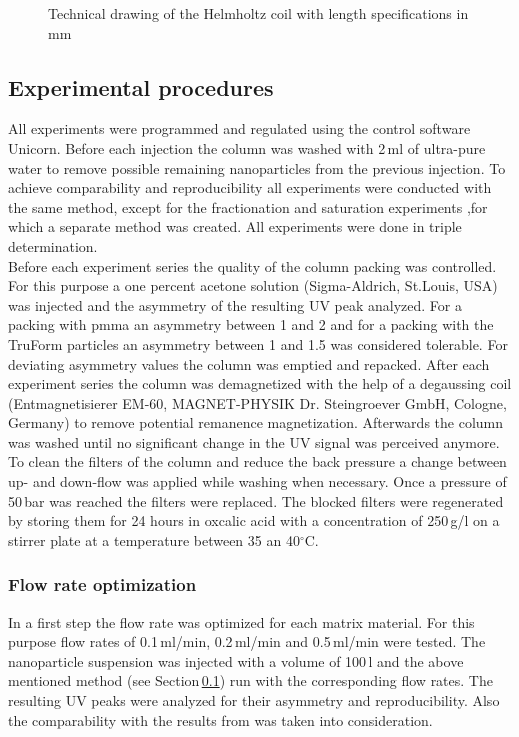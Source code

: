 \begin{figure}[H]
        \caption[Technical drawing of the Helmholtz coil]{Technical drawing of the Helmholtz coil with length specifications in mm }
        \label{fig:Helmholtz_coil}
  \end{figure}  

\subsection{Experimental procedures}
\label{subsec:Exp_Pro}
All experiments were programmed and regulated using the control software Unicorn. Before each injection the column was washed with 2\,ml of ultra-pure water to remove possible remaining nanoparticles from the previous injection. To achieve comparability and reproducibility all experiments were conducted with the same method, except for the fractionation and saturation experiments ,for which a separate method was created. All experiments were done in triple determination. \\
Before each experiment series the quality of the column packing was controlled. For this purpose a one percent acetone solution (Sigma-Aldrich, St.Louis, USA) was injected and the asymmetry of the  resulting UV peak analyzed. For a packing with \gls{pmma} an asymmetry between 1 and 2 and for a packing with the TruForm particles an asymmetry between 1 and 1.5 was considered tolerable. For deviating asymmetry values the column was emptied and repacked. After each experiment series the column was demagnetized with the help of a degaussing coil (Entmagnetisierer EM-60, MAGNET-PHYSIK Dr. Steingroever GmbH, Cologne, Germany) to remove potential remanence magnetization. Afterwards the column was washed until no significant change in the UV signal was perceived anymore. To clean the filters of the column and reduce the back pressure a change between up- and down-flow was applied while washing when necessary. Once a pressure of 50\,bar was reached the filters were replaced. The blocked filters were regenerated by storing them for 24 hours in oxcalic acid with a concentration of 250\,g/l on a stirrer plate at a temperature between 35 an 40$^\circ$C.

\subsubsection{Flow rate optimization}
\label{subsubsec:Flow_rate}
In a first step the flow rate was optimized for each matrix material. For this purpose flow rates of 0.1\,ml/min, 0.2\,ml/min and 0.5\,ml/min were tested. The nanoparticle suspension was injected with a volume of 100\,\textmu l and the above mentioned method (see Section\,\ref{subsec:Exp_Pro}) run with the corresponding flow rates. The resulting UV peaks were analyzed for their asymmetry and reproducibility. Also the comparability with the results from \cite{AndreMaster} was taken into consideration.  


